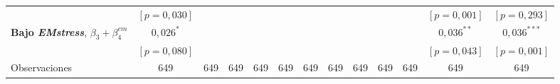 \begin{adjustbox}{max width=0.97\textwidth}
\begin{tabular}{l c ccc ccc ccc cc}
 & $[p=0{,}030]$ &  &  &  &  &  &  &  &  &  & $[p=0{,}001]$ & $[p=0{,}293]$ \\
\textbf{Bajo \textit{EMstress}}, $\beta_3+\beta_4^{em}$ & $0{,}026^{*}$ &  &  &  &  &  &  &  &  &  & $0{,}036^{**}$ & $0{,}036^{***}$ \\
 & $[p=0{,}080]$ &  &  &  &  &  &  &  &  &  & $[p=0{,}043]$ & $[p=0{,}001]$ \\
\addlinespace
Observaciones & 649 & 649 & 649 & 649 & 649 & 649 & 649 & 649 & 649 & 649 & 649 & 649 \\
\bottomrule
\end{tabular}
\end{adjustbox}\endgroup
